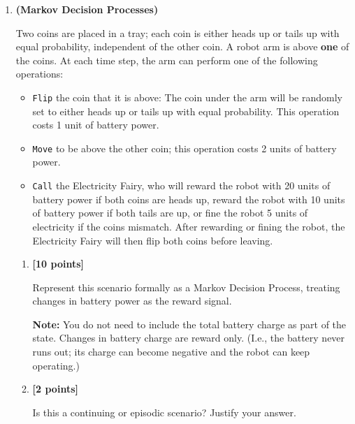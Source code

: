 \documentclass{article}
\newcounter{totalpoints}
\newcommand{\points}[1]{{\addtocounter{totalpoints}{#1}\textbf{[#1 points]}}}
\begin{document}
\pagestyle{myheadings}

\begin{enumerate}

\item \textbf{(Markov Decision Processes)}

    Two coins are placed in a tray; each coin is either heads up or tails up with equal probability, independent of the other coin.  A robot arm is above \textbf{one} of the coins.  At each time step, the arm can perform one of the following operations:
    \begin{itemize}
        \item \texttt{Flip} the coin that it is above: The coin under the arm will be randomly set to either heads up or tails up with equal probability.  This operation costs 1 unit of battery power.
        \item \texttt{Move} to be above the other coin; this operation costs 2 units of battery power.
        \item \texttt{Call} the Electricity Fairy, who will reward the robot with 20 units of battery power if both coins are heads up, reward the robot with 10 units of battery power if both tails are up, or fine the robot 5 units of electricity if the coins mismatch.  After rewarding or fining the robot, the Electricity Fairy will then flip both coins before leaving.
    \end{itemize}
\begin{enumerate}
    \item\points{10}
    Represent this scenario formally as a Markov Decision Process, treating changes in battery power as the reward signal.

    \textbf{Note:} You do not need to include the total battery charge as part of the state.  Changes in battery charge are reward only.  (I.e., the battery never runs out; its charge can become negative and the robot can keep operating.)
    
    \begin{answer}{2.5in}
    \end{answer}

    \item\points{2}
    Is this a continuing or episodic scenario?  Justify your answer.
    \begin{answer}{.75in}
    \end{answer}


\end{enumerate}
\end{enumerate}
\end{document}
